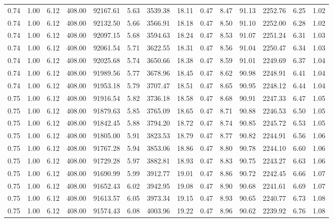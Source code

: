 \begin{table}[!ht]
\begin{tabular}{rrrrrrrrrrrrrr}
0.74 & 1.00 & 6.12 & 408.00 & 92167.61 & 5.63 & 3539.38 & 18.11 & 0.47 & 8.47 & 91.13 & 2252.76 & 6.25 & 1.02 \\
0.74 & 1.00 & 6.12 & 408.00 & 92132.50 & 5.66 & 3566.91 & 18.18 & 0.47 & 8.50 & 91.10 & 2252.00 & 6.28 & 1.02 \\
0.74 & 1.00 & 6.12 & 408.00 & 92097.15 & 5.68 & 3594.63 & 18.24 & 0.47 & 8.53 & 91.07 & 2251.24 & 6.31 & 1.03 \\
0.74 & 1.00 & 6.12 & 408.00 & 92061.54 & 5.71 & 3622.55 & 18.31 & 0.47 & 8.56 & 91.04 & 2250.47 & 6.34 & 1.03 \\
0.74 & 1.00 & 6.12 & 408.00 & 92025.68 & 5.74 & 3650.66 & 18.38 & 0.47 & 8.59 & 91.01 & 2249.69 & 6.37 & 1.04 \\
0.74 & 1.00 & 6.12 & 408.00 & 91989.56 & 5.77 & 3678.96 & 18.45 & 0.47 & 8.62 & 90.98 & 2248.91 & 6.41 & 1.04 \\
0.74 & 1.00 & 6.12 & 408.00 & 91953.18 & 5.79 & 3707.47 & 18.51 & 0.47 & 8.65 & 90.95 & 2248.12 & 6.44 & 1.04 \\
0.75 & 1.00 & 6.12 & 408.00 & 91916.54 & 5.82 & 3736.18 & 18.58 & 0.47 & 8.68 & 90.91 & 2247.33 & 6.47 & 1.05 \\
0.75 & 1.00 & 6.12 & 408.00 & 91879.63 & 5.85 & 3765.09 & 18.65 & 0.47 & 8.71 & 90.88 & 2246.53 & 6.50 & 1.05 \\
0.75 & 1.00 & 6.12 & 408.00 & 91842.45 & 5.88 & 3794.20 & 18.72 & 0.47 & 8.74 & 90.85 & 2245.72 & 6.53 & 1.05 \\
0.75 & 1.00 & 6.12 & 408.00 & 91805.00 & 5.91 & 3823.53 & 18.79 & 0.47 & 8.77 & 90.82 & 2244.91 & 6.56 & 1.06 \\
0.75 & 1.00 & 6.12 & 408.00 & 91767.28 & 5.94 & 3853.06 & 18.86 & 0.47 & 8.80 & 90.78 & 2244.10 & 6.60 & 1.06 \\
0.75 & 1.00 & 6.12 & 408.00 & 91729.28 & 5.97 & 3882.81 & 18.93 & 0.47 & 8.83 & 90.75 & 2243.27 & 6.63 & 1.06 \\
0.75 & 1.00 & 6.12 & 408.00 & 91690.99 & 5.99 & 3912.77 & 19.01 & 0.47 & 8.86 & 90.72 & 2242.45 & 6.66 & 1.07 \\
0.75 & 1.00 & 6.12 & 408.00 & 91652.43 & 6.02 & 3942.95 & 19.08 & 0.47 & 8.90 & 90.68 & 2241.61 & 6.69 & 1.07 \\
0.75 & 1.00 & 6.12 & 408.00 & 91613.57 & 6.05 & 3973.34 & 19.15 & 0.47 & 8.93 & 90.65 & 2240.77 & 6.73 & 1.08 \\
0.75 & 1.00 & 6.12 & 408.00 & 91574.43 & 6.08 & 4003.96 & 19.22 & 0.47 & 8.96 & 90.62 & 2239.92 & 6.76 & 1.08 \\

\end{tabular}
\end{table}
